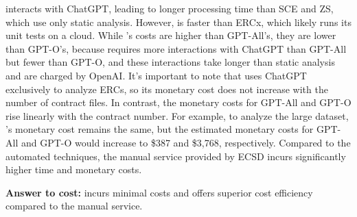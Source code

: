 \Tool{} interacts with ChatGPT, leading to longer processing time than 
SCE and ZS, which use only static analysis. 
However, \Tool{} is faster than ERCx, which likely runs its unit tests 
on a cloud. While \Tool{}'s costs are higher than GPT-All's, 
they are lower than GPT-O's, because \Tool{} requires more 
interactions with ChatGPT than GPT-All but fewer than GPT-O, 
and these interactions take longer than static analysis and are charged by OpenAI.
It's important to note that \Tool{} uses ChatGPT exclusively to analyze ERCs, 
so its monetary cost does not increase with the number of contract files. 
In contrast, the monetary costs for GPT-All and GPT-O rise linearly with the contract number. 
For example, to analyze the large dataset, \Tool{}'s monetary cost remains the same, but the estimated 
monetary costs for GPT-All and GPT-O would increase to \$387 and \$3,768, 
respectively.
Compared to the automated techniques,
the manual service provided by ECSD incurs significantly higher time and monetary costs.

\begin{tcolorbox}[size=title]
{\textbf{Answer to cost:} 
\Tool{} incurs minimal costs and offers superior cost efficiency compared to the manual service.}
\end{tcolorbox}




